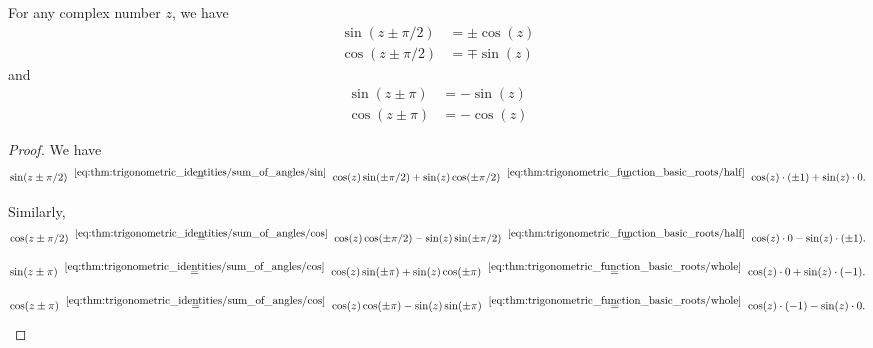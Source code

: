 \begin{proposition}\label{thm:trigonometric_function_period_identities}
  For any complex number \( z \), we have
  \begin{align}
    \sin(z \pm \pi / 2) &= \pm \cos(z) \label{eq:thm:trigonometric_function_period_identities/half/sin} \\
    \cos(z \pm \pi / 2) &= \mp \sin(z) \label{eq:thm:trigonometric_function_period_identities/half/cos}
  \end{align}
  and
  \begin{align}
    \sin(z \pm \pi) &= -\sin(z) \label{eq:thm:trigonometric_function_period_identities/full/sin} \\
    \cos(z \pm \pi) &= -\cos(z) \label{eq:thm:trigonometric_function_period_identities/full/cos}
  \end{align}
\end{proposition}
\begin{proof}
   We have
  \begin{equation*}
    \sin(z \pm \pi / 2)
    \reloset {\eqref{eq:thm:trigonometric_identities/sum_of_angles/sin}} =
    \cos(z) \sin(\pm \pi / 2) + \sin(z) \cos(\pm \pi / 2)
    \reloset {\eqref{eq:thm:trigonometric_function_basic_roots/half}} =
    \cos(z) \cdot (\pm 1) + \sin(z) \cdot 0.
  \end{equation*}

   Similarly,
  \begin{equation*}
    \cos(z \pm \pi / 2)
    \reloset {\eqref{eq:thm:trigonometric_identities/sum_of_angles/cos}} =
    \cos(z) \cos(\pm \pi / 2) - \sin(z) \sin(\pm \pi / 2)
    \reloset {\eqref{eq:thm:trigonometric_function_basic_roots/half}} =
    \cos(z) \cdot 0 - \sin(z) \cdot (\pm 1).
  \end{equation*}

  \begin{equation*}
    \sin(z \pm \pi)
    \reloset {\eqref{eq:thm:trigonometric_identities/sum_of_angles/cos}} =
    \cos(z) \sin(\pm \pi) + \sin(z) \cos(\pm \pi)
    \reloset {\eqref{eq:thm:trigonometric_function_basic_roots/whole}} =
    \cos(z) \cdot 0 + \sin(z) \cdot (-1).
  \end{equation*}

  \begin{equation*}
    \cos(z \pm \pi)
    \reloset {\eqref{eq:thm:trigonometric_identities/sum_of_angles/cos}} =
    \cos(z) \cos(\pm \pi) - \sin(z) \sin(\pm \pi)
    \reloset {\eqref{eq:thm:trigonometric_function_basic_roots/whole}} =
    \cos(z) \cdot (-1) - \sin(z) \cdot 0.
  \end{equation*}
\end{proof}

